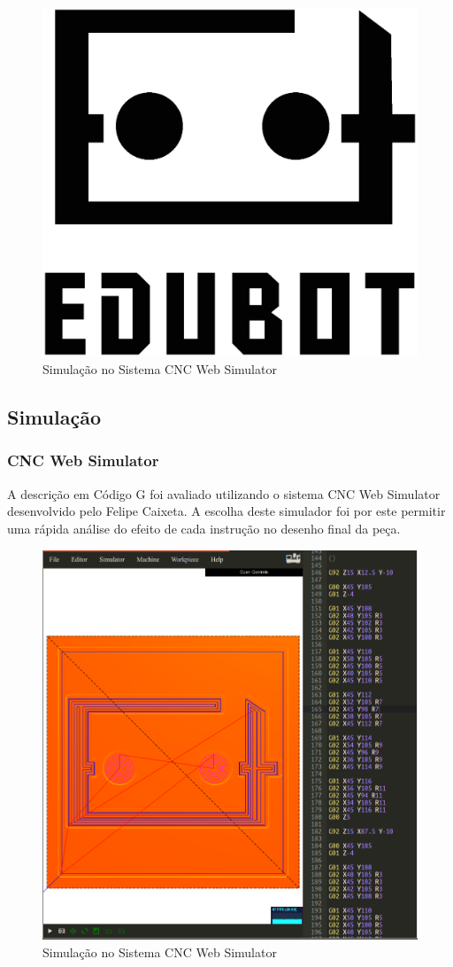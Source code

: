 \documentclass[a4paper,11pt]{article}
\begin{document}
\begin{figure}[H]
    \centering
    \includegraphics[width = 0.6\linewidth]{img/relat2/edubot}
    \caption{Simulação no Sistema CNC Web Simulator}
    \label{fig:edubot}
\end{figure}

\subsection{Simulação}
\subsubsection{CNC Web Simulator}
A descrição em Código G foi avaliado utilizando o sistema CNC Web Simulator desenvolvido pelo Felipe Caixeta.\cite{filipecaixeta_2016} A escolha deste  simulador foi por este permitir uma rápida análise do efeito de cada instrução no desenho final da peça.

\begin{figure}[H]
    \centering
    \includegraphics[width = 0.6\linewidth]{img/relat2/sim-fresa-web2}
    \caption{Simulação no Sistema CNC Web Simulator}
    \label{fig:placa-simCNCWebSimulator}
\end{figure}
\end{document}
